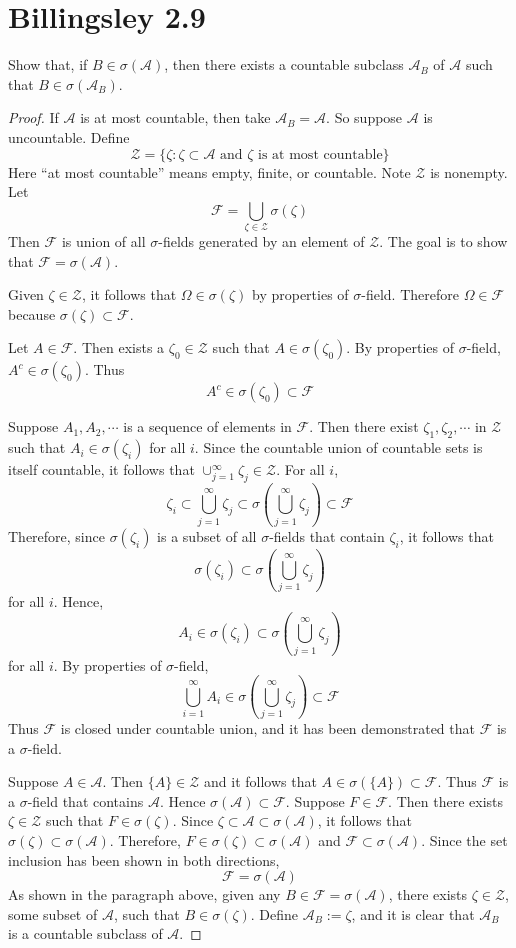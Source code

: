\documentclass[letterpaper, 12pt]{article}
\newcommand{\sA}{\mathscr{A}}
\newcommand{\cF}{\mathcal{F}}
\newcommand{\cZ}{\mathcal{Z}}
\begin{document}
\section*{Billingsley 2.9}
Show that, if $B \in \sigma(\sA)$, then there exists a countable subclass $\sA_B$ of $\sA$ such that $B \in \sigma(\sA_B)$.
\begin{proof}
If $\sA$ is at most countable, then take $\sA_B = \sA$. So suppose $\sA$ is uncountable. Define
\[
\cZ = \{ \zeta : \zeta \subset \sA
\text{ and $\zeta$ is at most countable}
\}
\]
Here ``at most countable'' means empty, finite, or countable. Note $\cZ$ is nonempty.
Let
\[
\cF = \bigcup_{\zeta \in \cZ} \sigma(\zeta)
\]
Then $\cF$ is union of all $\sigma$-fields generated by an element of $\cZ$. The goal is to show that $\cF = \sigma(\sA)$.

Given $\zeta \in \cZ$, it follows that $\Omega \in \sigma(\zeta)$ by properties of $\sigma$-field. Therefore $\Omega \in \cF$ because $\sigma(\zeta) \subset \cF$.

Let $A \in \cF$. Then exists a $\zeta_0 \in \cZ$ such that $A \in \sigma(\zeta_0)$. By properties of $\sigma$-field, $A^c \in \sigma(\zeta_0)$. Thus
\[
A^c \in \sigma(\zeta_0) \subset \cF
\]

Suppose $A_1, A_2, \cdots$ is a sequence of elements in $\cF$. Then there exist $\zeta_1, \zeta_2, \cdots$ in $\cZ$ such that $A_i \in \sigma(\zeta_i)$ for all $i$. Since the countable union of countable sets is itself countable, it follows that
$
\cup_{j=1}^\infty \zeta_j \in \cZ
$.
For all $i$,
\[
\zeta_i 
\subset 
\bigcup_{j=1}^\infty \zeta_j
\subset
\sigma
\left(
\bigcup_{j=1}^\infty \zeta_j
\right)
\subset
\cF
\]
Therefore, since $\sigma(\zeta_i)$ is a subset of all $\sigma$-fields that contain $\zeta_i$, it follows that 
\[
\sigma(\zeta_i) 
\subset 
\sigma
\left(
\bigcup_{j=1}^\infty \zeta_j
\right)
\]
for all $i$. Hence, 
\[
A_i 
\in 
\sigma(\zeta_i)
\subset
\sigma
\left(
\bigcup_{j=1}^\infty \zeta_j
\right)
\]
for all $i$. By properties of $\sigma$-field, 
\[
\bigcup_{i=1}^\infty 
A_i
\in
\sigma
\left(
\bigcup_{j=1}^\infty \zeta_j
\right)
\subset
\cF
\]
Thus $\cF$ is closed under countable union, and it has been demonstrated that $\cF$ is a $\sigma$-field.

Suppose $A \in \sA$. Then $\{A\} \in \cZ$ and it follows that $A \in \sigma(\{A\}) \subset \cF$.  Thus $\cF$ is a $\sigma$-field that contains $\sA$. Hence $\sigma(\sA) \subset \cF$. Suppose $F \in \cF$. Then there exists $\zeta \in \cZ$ such that $F \in \sigma(\zeta)$. Since $\zeta \subset \sA \subset \sigma(\sA)$, it follows that $\sigma(\zeta) \subset \sigma(\sA)$. 
Therefore, $F \in \sigma(\zeta) \subset \sigma(\sA)$ and $\cF \subset \sigma(\sA)$. Since the set inclusion has been shown in both directions,
\[
\cF = \sigma(\sA)
\]
As shown in the paragraph above, given any $B \in \cF = \sigma(\sA)$, there exists $\zeta \in \cZ$, some subset of $\sA$, such that $B \in \sigma(\zeta)$. Define $\sA_B := \zeta$, and it is clear that $\sA_B$ is a countable subclass of $\sA$.
\end{proof}
\end{document}
